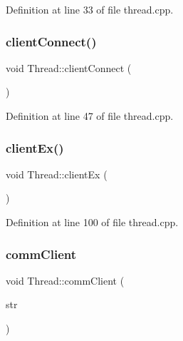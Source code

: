 Definition at line 33 of file thread.\+cpp.

\mbox{\label{class_thread_a580dfe219e95afd325ddad77e2a59fef}} 
\subsubsection{\texorpdfstring{client\+Connect()}{clientConnect()}}
{\footnotesize\ttfamily void Thread\+::client\+Connect (\begin{DoxyParamCaption}{ }\end{DoxyParamCaption})}



Definition at line 47 of file thread.\+cpp.

\mbox{\label{class_thread_a852c3ba7d23b38d01e21a568f3e068d3}} 
\subsubsection{\texorpdfstring{client\+Ex()}{clientEx()}}
{\footnotesize\ttfamily void Thread\+::client\+Ex (\begin{DoxyParamCaption}{ }\end{DoxyParamCaption})\hspace{0.3cm}{\ttfamily [private]}}



Definition at line 100 of file thread.\+cpp.

\mbox{\label{class_thread_a263c49745ef39e51461339f482da6465}} 
\subsubsection{\texorpdfstring{comm\+Client}{commClient}}
{\footnotesize\ttfamily void Thread\+::comm\+Client (\begin{DoxyParamCaption}\item[{Q\+String}]{str }\end{DoxyParamCaption})\hspace{0.3cm}{\ttfamily [signal]}}

\mbox{\label{class_thread_a3a648f8e1ca34baf6a9c9ce98d51f498}} 
